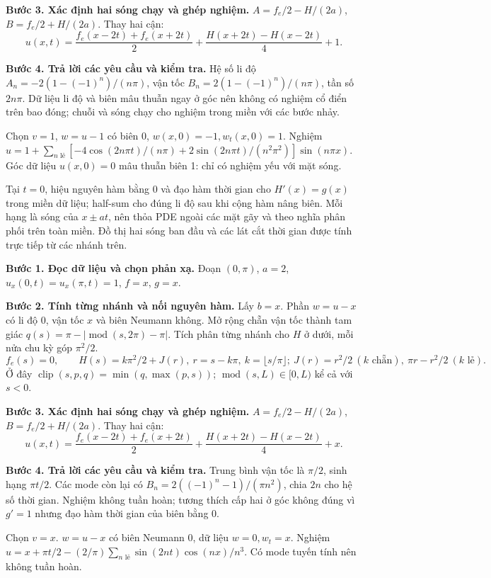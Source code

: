 \textbf{Bước 3. Xác định hai sóng chạy và ghép nghiệm.} $A=f_e/2-H/(2a)$, $B=f_e/2+H/(2a)$. Thay hai cận:
\[u(x,t)=\frac{f_e(x-2t)+f_e(x+2t)}2+\frac{H(x+2t)-H(x-2t)}{4}+1.\]

\textbf{Bước 4. Trả lời các yêu cầu và kiểm tra.} Hệ số li độ $A_n=-2(1-(-1)^n)/(n\pi)$, vận tốc $B_n=2(1-(-1)^n)/(n\pi)$, tần số $2n\pi$. Dữ liệu li độ và biên mâu thuẫn ngay ở góc nên không có nghiệm cổ điển trên bao đóng; chuỗi và sóng chạy cho nghiệm trong miền với các bước nhảy.

Chọn $v=1$, $w=u-1$ có biên 0, $w(x,0)=-1,w_t(x,0)=1$. Nghiệm $u=1+\sum_{n\text{ lẻ}}[-4\cos(2n\pi t)/(n\pi)+2\sin(2n\pi t)/(n^2\pi^2)]\sin(n\pi x)$. Góc dữ liệu $u(x,0)=0$ mâu thuẫn biên 1: chỉ có nghiệm yếu với mặt sóng.

Tại $t=0$, hiệu nguyên hàm bằng $0$ và đạo hàm thời gian cho $H'(x)=g(x)$ trong miền dữ liệu; half-sum cho đúng li độ sau khi cộng hàm nâng biên. Mỗi hạng là sóng của $x\pm at$, nên thỏa PDE ngoài các mặt gãy và theo nghĩa phân phối trên toàn miền. Đồ thị hai sóng ban đầu và các lát cắt thời gian được tính trực tiếp từ các nhánh trên.

\textbf{Bước 1. Đọc dữ liệu và chọn phản xạ.} Đoạn $(0,\pi)$, $a=2$, $u_x(0,t)=u_x(\pi,t)=1$, $f=x$, $g=x$.

\textbf{Bước 2. Tính từng nhánh và nối nguyên hàm.} Lấy $b=x$. Phần $w=u-x$ có li độ $0$, vận tốc $x$ và biên Neumann không. Mở rộng chẵn vận tốc thành tam giác $q(s)=\pi-|\operatorname{mod}(s,2\pi)-\pi|$. Tích phân từng nhánh cho $H$ ở dưới, mỗi nửa chu kỳ góp $\pi^2/2$.
\[f_e(s)=0,\qquad H(s)=k\pi^2/2+J(r),\ r=s-k\pi,\ k=\lfloor s/\pi\rfloor;\ J(r)=r^2/2\ (k\text{ chẵn}),\ \pi r-r^2/2\ (k\text{ lẻ}).\]
Ở đây $\operatorname{clip}(s,p,q)=\min(q,\max(p,s))$; $\operatorname{mod}(s,L)\in[0,L)$ kể cả với $s<0$.

\textbf{Bước 3. Xác định hai sóng chạy và ghép nghiệm.} $A=f_e/2-H/(2a)$, $B=f_e/2+H/(2a)$. Thay hai cận:
\[u(x,t)=\frac{f_e(x-2t)+f_e(x+2t)}2+\frac{H(x+2t)-H(x-2t)}{4}+x.\]

\textbf{Bước 4. Trả lời các yêu cầu và kiểm tra.} Trung bình vận tốc là $\pi/2$, sinh hạng $\pi t/2$. Các mode còn lại có $B_n=2(( -1)^n-1)/(\pi n^2)$, chia $2n$ cho hệ số thời gian. Nghiệm không tuần hoàn; tương thích cấp hai ở góc không đúng vì $g'=1$ nhưng đạo hàm thời gian của biên bằng $0$.

Chọn $v=x$. $w=u-x$ có biên Neumann 0, dữ liệu $w=0,w_t=x$. Nghiệm $u=x+\pi t/2-(2/\pi)\sum_{n\text{ lẻ}}\sin(2nt)\cos(nx)/n^3$. Có mode tuyến tính nên không tuần hoàn.

